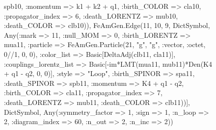 \documentclass{revtex4}
\begin{document}
\begin{figure}[!htb]
\begin{center}
{spb10, :momentum => k1 + k2 + q1, :birth_COLOR => cla10, :propagator_index => 6, :death_LORENTZ => mub10, :death_COLOR => clb10)), FeAmGen.Edge(11, 10, 9, Dict{Symbol, Any}(:mark => 11, :null_MOM => 0, :birth_LORENTZ => mua11, :particle => FeAmGen.Particle(21, "g", "g", :vector, :octet, 0//1, 0, 0), :color_list => Basic[DeltaAdj(clb11, cla11)], :couplings_lorentz_list => Basic[-im*LMT(mua11, mub11)*Den(K4 + q1 - q2, 0, 0)], :style => "Loop", :birth_SPINOR => spa11, :death_SPINOR => spb11, :momentum => K4 + q1 - q2, :birth_COLOR => cla11, :propagator_index => 7, :death_LORENTZ => mub11, :death_COLOR => clb11))], Dict{Symbol, Any}(:symmetry_factor => 1, :sign => 1, :n_loop => 2, :diagram_index => 60, :n_out => 2, :n_inc => 2)) 
}
\end{center}
\end{figure}
\end{document}
